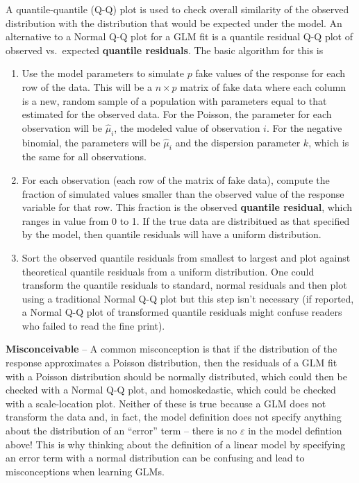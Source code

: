 \documentclass[]{book}
\providecommand{\tightlist}{%
  \setlength{\itemsep}{0pt}\setlength{\parskip}{0pt}}
\begin{document}
A quantile-quantile (Q-Q) plot is used to check overall similarity of
the observed distribution with the distribution that would be expected
under the model. An alternative to a Normal Q-Q plot for a GLM fit is a
quantile residual Q-Q plot of observed vs.~expected \textbf{quantile
residuals}. The basic algorithm for this is

\begin{enumerate}
\def\labelenumi{\arabic{enumi}.}
\tightlist
\item
  Use the model parameters to simulate \(p\) fake values of the response
  for each row of the data. This will be a \(n \times p\) matrix of fake
  data where each column is a new, random sample of a population with
  parameters equal to that estimated for the observed data. For the
  Poisson, the parameter for each observation will be \(\hat{\mu}_i\),
  the modeled value of observation \(i\). For the negative binomial, the
  parameters will be \(\hat{\mu}_i\) and the dispersion parameter \(k\),
  which is the same for all observations.
\item
  For each observation (each row of the matrix of fake data), compute
  the fraction of simulated values smaller than the observed value of
  the response variable for that row. This fraction is the observed
  \textbf{quantile residual}, which ranges in value from 0 to 1. If the
  true data are distribitued as that specified by the model, then
  quantile residuals will have a uniform distribution.
\item
  Sort the observed quantile residuals from smallest to largest and plot
  against theoretical quantile residuals from a uniform distribution.
  One could transform the quantile residuals to standard, normal
  residuals and then plot using a traditional Normal Q-Q plot but this
  step isn't necessary (if reported, a Normal Q-Q plot of transformed
  quantile residuals might confuse readers who failed to read the fine
  print).
\end{enumerate}

\textbf{Misconceivable} -- A common misconception is that if the
distribution of the response approximates a Poisson distribution, then
the residuals of a GLM fit with a Poisson distribution should be
normally distributed, which could then be checked with a Normal Q-Q
plot, and homoskedastic, which could be checked with a scale-location
plot. Neither of these is true because a GLM does not transform the data
and, in fact, the model definition does not specify anything about the
distribution of an ``error'' term -- there is no \(\varepsilon\) in the
model defintion above! This is why thinking about the definition of a
linear model by specifying an error term with a normal distribution can
be confusing and lead to misconceptions when learning GLMs.
\end{document}
